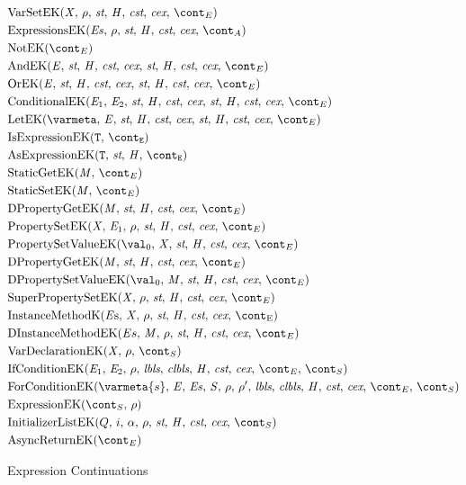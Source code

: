 \documentclass[a4paper,oneside,fleqn]{article}
\newcommand{\idmeta}{\ensuremath{\mathit{X}}}
\begin{document}
\newcommand{\ForCondK}{\mathrm{ForConditionEK}(\varmeta{s},\, \expressionmeta,\, \exprs,\, \statementmeta,\, \env,\, \env',\, \lbls,\, \clbls,\, \handler,\, \cstrace,\, \cex,\, \econt,\, \scont)}
\newcommand{\ExpressionK}[2]{\mathrm{ExpressionEK}({#1},\,{#2})}

\newcommand{\AsyncReturnEK}[1]{\mathrm{AsyncReturnEK}({#1})}

\begin{figure}[Htp]
  \begin{eqfigure}
  \begin{align}
    &\VarSetK{\idmeta}{\env}{\ExceptionHandlers}{\econt} \label{econt:varset}\\
    &\ExpressionsK{\exprs}{\env}{\acont} \label{econt:expressions}\\
    &\NotK{\econt} \label{econt:not}\\
    &\AndK{\expressionmeta}{\ExceptionHandlers}{\econt} \label{econt:and}\\
    &\OrK{\expressionmeta}{\ExceptionHandlers}{\econt} \label{econt:or}\\
    &\ConditionalK{\expressionmeta_1}{\expressionmeta_2}{\ExceptionHandlers}{\econt} \label{econt:cond}\\
    &\LetK{\varmeta}{\expressionmeta}{\ExceptionHandlers}{\econt} \label{econt:let}\\
    &\IsExpressionK \label{econt:is}\\
    &\AsExpressionK \label{econt:as}\\
    &\StaticGetK \label{econt:static-get}\\
    &\StaticSetK \label{econt:static-set}\\
    &\DPropertyGetK \label{econt:dproperty-get}\\
    &\PropertySetK \label{econt:property-set}\\
    &\PropertySetVK \label{econt:property-set}\\
    &\DPropertyGetK \label{econt:dproperty-set}\\
    &\DPropertySetVK \label{econt:dproperty-set-v}\\
    &\SuperPropertySetK \label{econt:super-property-set}\\
    &\InstanceMethodK{\strace} \label{econt:instance-method}\\
    &\DInstanceMethodK{\strace} \label{econt:dinstance-method}\\
    &\VarDeclK{\idmeta}{\env}{\scont} \label{econt:var-decl}\\
    &\IfCondK{\expressionmeta_1}{\expressionmeta_2} \label{econt:if-cond}\\
    &\ForCondK \label{econt:for-cond}\\
    &\ExpressionK{\scont}{\env} \label{econt:expression}\\
    &\InitializerListEK{Q}{i}{\loc}{\env}{\scont} \label{econt:initializer-list}\\
    &\AsyncReturnEK{\econt}
  \end{align}
  \caption{Expression Continuations}
  \label{figure:econts}
  \end{eqfigure}
\end{figure}
\end{document}
